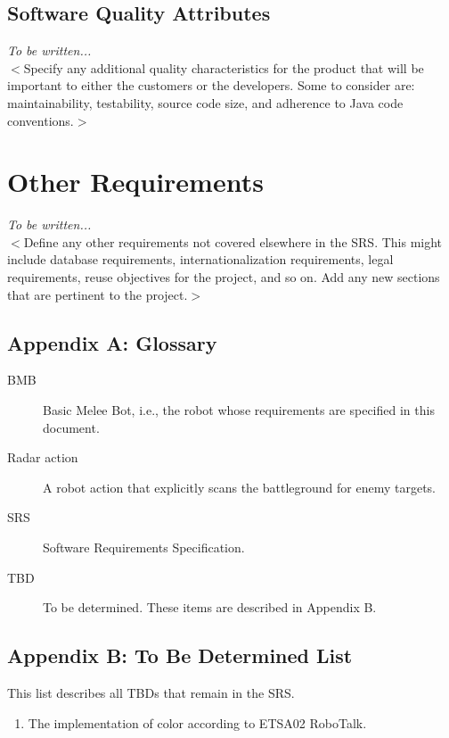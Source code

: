 \documentclass{scrreprt}
\begin{document}
\section{Software Quality Attributes}
\textit{To be written...}\\
$<$Specify any additional quality characteristics for the product that will be important to either the customers or the developers. Some to consider are: maintainability, testability, source code size, and adherence to Java code conventions.$>$

\chapter{Other Requirements}
\textit{To be written...}\\
$<$Define any other requirements not covered elsewhere in the SRS. This might include database requirements, internationalization requirements, legal requirements, reuse objectives for the project, and so on. Add any new sections that are pertinent to the project.$>$

\section*{Appendix A: Glossary}

\begin{description}
\item[BMB] Basic Melee Bot, i.e., the robot whose requirements are specified in this document.
\item[Radar action] A robot action that explicitly scans the battleground for enemy targets.
\item[SRS] Software Requirements Specification.
\item[TBD] To be determined. These items are described in Appendix B.
\end{description}

\section*{Appendix B: To Be Determined List}
This list describes all TBDs that remain in the SRS.
\begin{enumerate}
\item The implementation of color according to ETSA02 RoboTalk.
\end{enumerate}
\end{document}
